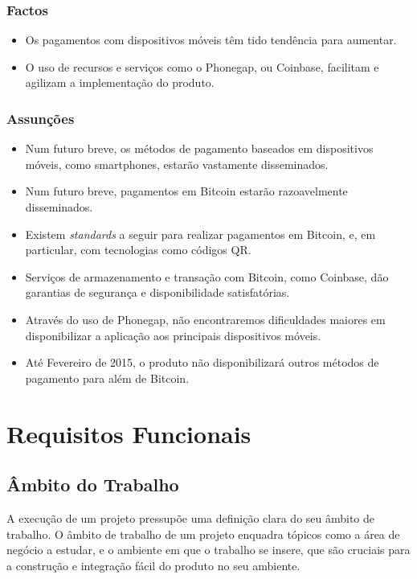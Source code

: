 \documentclass{article}
\begin{document}
    \subsubsection{Factos}
    \begin{itemize}
      \item Os pagamentos com dispositivos móveis têm tido tendência para aumentar.
      \item O uso de recursos e serviços como o Phonegap, ou Coinbase, facilitam e agilizam a implementação do produto.
    \end{itemize}

    \subsubsection{Assunções}
    \begin{itemize}
      \item Num futuro breve, os métodos de pagamento baseados em dispositivos móveis, como smartphones, estarão vastamente disseminados.
      \item Num futuro breve, pagamentos em Bitcoin estarão razoavelmente disseminados.
      \item Existem \emph{standards} a seguir para realizar pagamentos em Bitcoin, e, em particular, com tecnologias como códigos QR.
      \item Serviços de armazenamento e transação com Bitcoin, como Coinbase, dão garantias de segurança e disponibilidade satisfatórias.
      \item Através do uso de Phonegap, não encontraremos dificuldades maiores em disponibilizar a aplicação aos principais dispositivos móveis.
      \item Até Fevereiro de 2015, o produto não disponibilizará outros métodos de pagamento para além de Bitcoin.
    \end{itemize}
\newpage

\section{Requisitos Funcionais}

  \subsection{Âmbito do Trabalho}

    A execução de um projeto pressupõe uma definição clara do seu âmbito de trabalho. O âmbito de trabalho de um projeto enquadra tópicos como a área de negócio a estudar, e o ambiente em que o trabalho se insere, que são cruciais para a construção e integração fácil do produto no seu ambiente.
\end{document}
